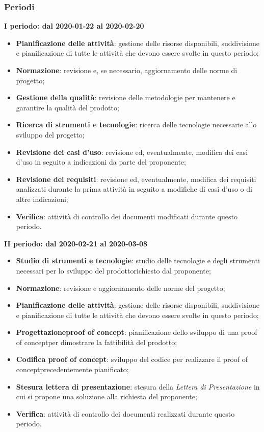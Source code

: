 \subsubsection{Periodi}
\textbf{I periodo: dal 2020-01-22 al 2020-02-20}
\begin{itemize}
	\item \textbf{Pianificazione delle attività}: gestione delle risorse disponibili, suddivisione e pianificazione di tutte le attività che devono essere svolte in questo periodo;
	\item \textbf{Normazione}: revisione e, se necessario, aggiornamento delle norme di progetto\glo;
	\item \textbf{Gestione della qualità}: revisione delle metodologie per mantenere e garantire la qualità del prodotto\glo;
	\item \textbf{Ricerca di strumenti e tecnologie}: ricerca delle tecnologie necessarie allo sviluppo del progetto\glo;
	\item \textbf{Revisione dei casi d'uso}: revisione ed, eventualmente, modifica dei casi d'uso in seguito a indicazioni da parte del proponente;
	\item \textbf{Revisione dei requisiti}: revisione ed, eventualmente, modifica dei requisiti analizzati durante la prima attività in seguito a modifiche di casi d'uso o di altre indicazioni; 
	\item \textbf{Verifica}: attività di controllo dei documenti modificati durante questo periodo.
\end{itemize}

\textbf{II periodo: dal 2020-02-21 al 2020-03-08}
\begin{itemize}
	\item \textbf{Studio di strumenti e tecnologie}: studio delle tecnologie e degli strumenti necessari per lo sviluppo del prodotto\glosp richiesto dal proponente;
	\item \textbf{Normazione}: revisione e aggiornamento delle norme del progetto\glo;
	\item \textbf{Pianificazione delle attività}: gestione delle risorse disponibili, suddivisione e pianificazione di tutte le attività che devono essere svolte in questo periodo;
	\item \textbf{Progettazione}\glosp\textbf{proof of concept}\glo: pianificazione dello sviluppo di una proof of concept\glosp per dimostrare la fattibilità del prodotto\glo;
	\item \textbf{Codifica proof of concept}\glo: sviluppo del codice per realizzare il proof of concept\glosp precedentemente pianificato;
	\item \textbf{Stesura lettera di presentazione}: stesura della \textit{Lettera di Presentazione} in cui si propone una soluzione alla richiesta del proponente;
	\item \textbf{Verifica}: attività di controllo dei documenti realizzati durante questo periodo.
\end{itemize}

